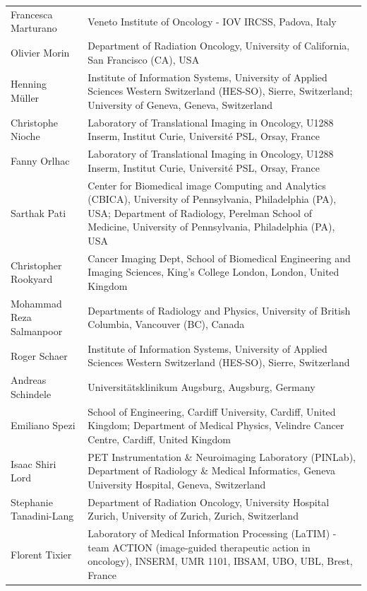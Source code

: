 \documentclass[fleqn,a4paper,oneside,openany]{book}
\begin{document}
\begin{longtable}{p{4cm}p{10cm}}
Francesca Marturano
& Veneto Institute of Oncology - IOV IRCSS, Padova, Italy\\
Olivier Morin
& Department of Radiation Oncology, University of California, San Francisco (CA), USA\\ 
Henning Müller
& Institute of Information Systems, University of Applied Sciences Western Switzerland (HES-SO), Sierre, Switzerland; University of Geneva, Geneva, Switzerland\\ 
Christophe Nioche
& Laboratory of Translational Imaging in Oncology, U1288 Inserm, Institut Curie, Université PSL, Orsay, France \\ 
Fanny Orlhac
& Laboratory of Translational Imaging in Oncology, U1288 Inserm, Institut Curie, Université PSL, Orsay, France \\ 
Sarthak Pati
& Center for Biomedical image Computing and Analytics (CBICA), University of Pennsylvania, Philadelphia (PA), USA; Department of Radiology, Perelman School of Medicine, University of Pennsylvania, Philadelphia (PA), USA\\ 
Christopher Rookyard
& Cancer Imaging Dept, School of Biomedical Engineering and Imaging Sciences, King’s College London, London, United Kingdom\\
Mohammad Reza Salmanpoor & Departments of Radiology and Physics, University of British Columbia, Vancouver (BC), Canada\\
Roger Schaer
& Institute of Information Systems, University of Applied Sciences Western Switzerland (HES-SO), Sierre, Switzerland\\ 
Andreas Schindele
& Universitätsklinikum Augsburg, Augsburg, Germany\\ 
Emiliano Spezi
& School of Engineering, Cardiff University, Cardiff, United Kingdom; Department of Medical Physics, Velindre Cancer Centre, Cardiff, United Kingdom\\ 
Isaac Shiri Lord & PET Instrumentation \& Neuroimaging Laboratory (PINLab), Department of Radiology \& Medical Informatics, Geneva University Hospital, Geneva, Switzerland\\
Stephanie Tanadini-Lang
& Department of Radiation Oncology, University Hospital Zurich, University of Zurich, Zurich, Switzerland\\ 
Florent Tixier
& Laboratory of Medical Information Processing (LaTIM) - team ACTION (image-guided therapeutic action in oncology), INSERM, UMR 1101, IBSAM, UBO, UBL, Brest, France\\

\end{longtable}
\end{document}

